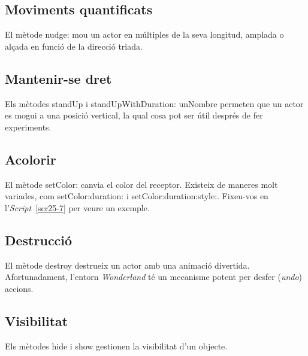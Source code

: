 \subsection{Moviments quantificats}
El mètode \textsf{nudge:} mou un actor en múltiples de la seva longitud, amplada o alçada en funció de la direcció triada.

\subsection{Mantenir-se dret}
Els mètodes \textsf{standUp} i \textsf{standUpWithDuration: unNombre} permeten que un actor es mogui a una posició vertical, la qual cosa pot ser útil després de fer experiments.

\subsection{Acolorir}
El mètode \textsf{setColor:} canvia el color del receptor. Existeix de maneres molt variades, com \textsf{setColor:duration:} i \textsf{setColor:duration:style:}. Fixeu-vos en l'\emph{Script}~\ref{scr25-7} per veure un exemple.

\subsection{Destrucció}
El mètode \textsf{destroy} destrueix un actor amb una animació divertida. Afortunadament, l'entorn \emph{Wonderland} té un mecanisme potent per desfer (\emph{undo}) accions.

\subsection{Visibilitat}
Els mètodes \textsf{hide} i \textsf{show} gestionen la visibilitat d'un objecte.

